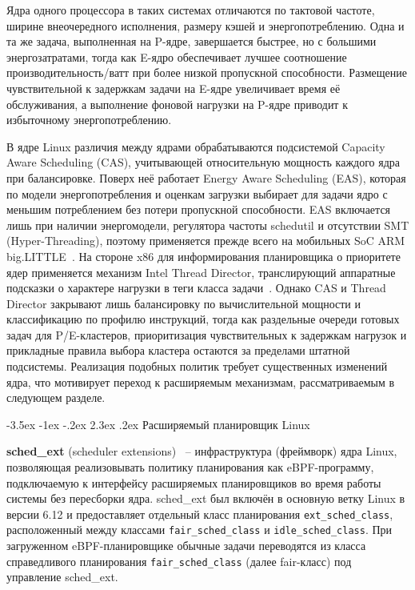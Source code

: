 \documentclass[14pt, oneside]{extbook}
\makeatletter
\renewcommand\section{\@startsection {section}{1}{\z@}%
                                   {-3.5ex \@plus -1ex \@minus -.2ex}%
                                   {2.3ex \@plus.2ex}%
                                   {\normalfont\fontsize{16}{20}\selectfont\bfseries}}
\makeatother
\begin{document}
        Ядра одного процессора в таких системах отличаются по
        тактовой частоте, ширине внеочередного исполнения, размеру
        кэшей и энергопотреблению. Одна и та же задача, выполненная
        на P-ядре, завершается быстрее, но с большими
        энергозатратами, тогда как E-ядро обеспечивает лучшее соотношение
        производительность/ватт при более низкой пропускной
        способности. Размещение чувствительной к задержкам задачи
        на E-ядре увеличивает время её обслуживания, а выполнение
        фоновой нагрузки на P-ядре приводит к избыточному
        энергопотреблению.

        В ядре Linux различия между ядрами обрабатываются
        подсистемой Capacity Aware Scheduling (CAS), учитывающей
        относительную мощность каждого ядра при балансировке.
        Поверх неё работает Energy Aware Scheduling (EAS), которая
        по модели энергопотребления и оценкам загрузки выбирает
        для задачи ядро с меньшим потреблением без потери
        пропускной способности. EAS включается лишь при наличии
        энергомодели, регулятора частоты schedutil и отсутствии
        SMT (Hyper-Threading), поэтому применяется прежде всего на
        мобильных SoC ARM big.LITTLE~\cite{eas}. На стороне x86
        для информирования планировщика о приоритете ядер
        применяется механизм Intel Thread Director, транслирующий
        аппаратные подсказки о характере нагрузки в теги класса
        задачи~\cite{intelhybrid}. Однако CAS и Thread Director закрывают лишь
        балансировку по вычислительной мощности и классификацию по
        профилю инструкций, тогда как раздельные очереди готовых задач
        для P/E-кластеров,
        приоритизация чувствительных к задержкам нагрузок и прикладные
        правила выбора кластера остаются за пределами штатной
        подсистемы. Реализация подобных политик требует существенных
        изменений ядра, что мотивирует переход к расширяемым
        механизмам, рассматриваемым в следующем разделе.


\section{Расширяемый планировщик Linux}\label{sec:schedext}

        \textbf{sched\_ext} (scheduler extensions)~\cite{schedext} --
        инфраструктура (фреймворк) ядра Linux, позволяющая
        реализовывать политику планирования как eBPF-программу,
        подключаемую к интерфейсу расширяемых планировщиков во
        время работы системы без пересборки ядра. sched\_ext был
        включён в основную ветку Linux в версии 6.12 и
        предоставляет отдельный класс планирования
        \texttt{ext\_sched\_class}, расположенный между классами
        \texttt{fair\_sched\_class} и \texttt{idle\_sched\_class}.
        При загруженном eBPF-планировщике обычные задачи
        переводятся из класса справедливого планирования
        \texttt{fair\_sched\_class} (далее fair-класс) под
        управление sched\_ext.
\end{document}
